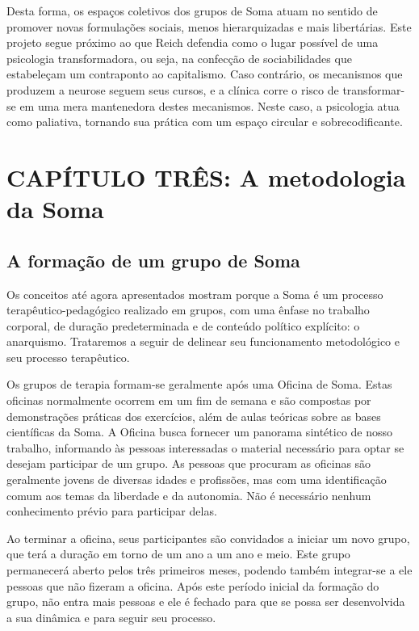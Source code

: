 Desta forma, os espaços coletivos dos grupos de Soma atuam no sentido de
promover novas formulações sociais, menos hierarquizadas e mais
libertárias. Este projeto segue próximo ao que Reich defendia como o
lugar possível de uma psicologia transformadora, ou seja, na confecção
de sociabilidades que estabeleçam um contraponto ao capitalismo. Caso
contrário, os mecanismos que produzem a neurose seguem seus cursos, e a
clínica corre o risco de transformar-se em uma mera mantenedora destes
mecanismos. Neste caso, a psicologia atua como paliativa, tornando sua
prática com um espaço circular e sobrecodificante.

\chapter{CAPÍTULO TRÊS: A metodologia da Soma}

\section{A formação de um grupo de Soma}

Os conceitos até agora apresentados mostram porque a Soma é um processo
terapêutico-pedagógico realizado em grupos, com uma ênfase no trabalho
corporal, de duração predeterminada e de conteúdo político explícito: o
anarquismo. Trataremos a seguir de delinear seu funcionamento
metodológico e seu processo terapêutico.

Os grupos de terapia formam-se geralmente após uma Oficina de Soma.
Estas oficinas normalmente ocorrem em um fim de semana e são compostas
por demonstrações práticas dos exercícios, além de aulas teóricas sobre
as bases científicas da Soma. A Oficina busca fornecer um panorama
sintético de nosso trabalho, informando às pessoas interessadas o
material necessário para optar se desejam participar de um grupo. As
pessoas que procuram as oficinas são geralmente jovens de diversas
idades e profissões, mas com uma identificação comum aos temas da
liberdade e da autonomia. Não é necessário nenhum conhecimento prévio
para participar delas.

Ao terminar a oficina, seus participantes são convidados a iniciar um
novo grupo, que terá a duração em torno de um ano a um ano e meio. Este
grupo permanecerá aberto pelos três primeiros meses, podendo também
integrar-se a ele pessoas que não fizeram a oficina. Após este período
inicial da formação do grupo, não entra mais pessoas e ele é fechado
para que se possa ser desenvolvida a sua dinâmica e para seguir seu
processo.

